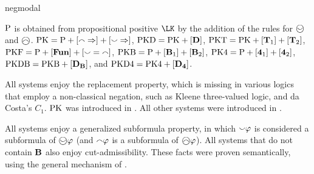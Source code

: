 \begin{entry}{negmodal}
\begin{calculus}
\end{calculus}


 \begin{clarifications}
 ${\rm {P}}$ is obtained from propositional positive $\LK$
 by the addition of the rules for $\wsmile$ and $\wfrown$.
 {${\rm {PK}}={\rm {P}}+[{\smallfrown}\Rightarrow]+[{\smallsmile}\Rightarrow]$,}
 {${\rm {PKD}}={\rm {PK}}+[{\bf D}]$,}
 {${\rm {PKT}}={\rm {PK}}+[{\bf T}_{1}]+[{\bf T}_{2}]$,}
 {${\rm {PKF}}={\rm {P}}+[{\bf Fun}]+[{\smallsmile}={\smallfrown}]$,}
 {${\rm {PKB}}={\rm {P}}+[{\bf B}_{1}]+[{\bf B}_{2}]$,}
 {${\rm {PK4}}={\rm {P}}+[{\bf 4}_{1}]+[{\bf 4}_{2}]$,}
 {${\rm {PKDB}}={\rm {PKB}}+[{\bf D}_{{\bf B}}]$,} and
 {${\rm {PKD4}}={\rm {PK4}}+[{\bf D}_{{\bf 4}}]$.}

 \end{clarifications}

 \begin{history}
All systems enjoy the replacement property,
 which is missing in various logics that employ a non-classical negation,
 such as Kleene three-valued logic, and da Costa's $C_{1}$.
${\rm {PK}}$ was introduced in \cite{dod:mar:ENTCS2013}. All other systems were introduced in \cite{Lahav2017}.
 \end{history}

 \begin{technicalities}
All systems enjoy a generalized subformula property,
in which ${\smallsmile}\varphi$ is considered a subformula of $\wsmile\varphi$
(and ${\smallfrown}\varphi$ is a subformula of $\wfrown\varphi$).
All systems that do not contain ${\bf B}$ also enjoy
cut-admissibility.
These facts were proven semantically, using
the general mechanism of \cite{Lahav:2013:USF:2555591.2528930}.
 \end{technicalities}



\end{entry}
